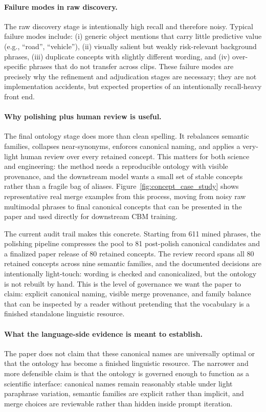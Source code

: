 \paragraph{Failure modes in raw discovery.}
The raw discovery stage is intentionally high recall and therefore noisy.
Typical failure modes include: (i) generic object mentions that carry little
predictive value (e.g., ``road'', ``vehicle''), (ii) visually salient but weakly
risk-relevant background phrases, (iii) duplicate concepts with slightly different
wording, and (iv) over-specific phrases that do not transfer across clips.
These failure modes are precisely why the refinement and adjudication stages
are necessary; they are not implementation accidents, but expected properties
of an intentionally recall-heavy front end.

\paragraph{Why polishing plus human review is useful.}
The final ontology stage does more than clean spelling. It rebalances semantic
families, collapses near-synonyms, enforces canonical naming, and applies a
very-light human review over every retained concept. This matters for both
science and engineering: the method needs a reproducible ontology with visible
provenance, and the downstream model wants a small set of stable concepts
rather than a fragile bag of aliases. Figure~\ref{fig:concept_case_study} shows
representative real merge examples from this process, moving from noisy raw
multimodal phrases to final canonical concepts that can be presented in the
paper and used directly for downstream CBM training.

The current audit trail makes this concrete. Starting from 611 mined phrases,
the polishing pipeline compresses the pool to 81 post-polish canonical
candidates and a finalized paper release of 80 retained concepts. The review
record spans all 80 retained concepts across nine semantic families, and the
documented decisions are intentionally light-touch: wording is checked and
canonicalized, but the ontology is not rebuilt by hand. This is the level of
governance we want the paper to claim: explicit canonical naming, visible merge
provenance, and family balance that can be inspected by a reader without
pretending that the vocabulary is a finished standalone linguistic resource.

\paragraph{What the language-side evidence is meant to establish.}
The paper does not claim that these canonical names are universally optimal or
that the ontology has become a finished linguistic resource. The narrower and
more defensible claim is that the ontology is governed enough to function as a
scientific interface: canonical names remain reasonably stable under light
paraphrase variation, semantic families are explicit rather than implicit, and
merge choices are reviewable rather than hidden inside prompt iteration.

